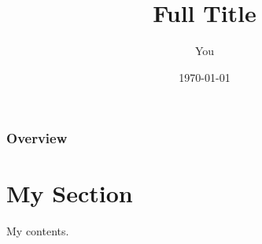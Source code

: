 \documentclass{beamer}
\title[Short Title]{Full Title}
\author{You}
\institute[Short Institution]{Full Institution \\ \medskip\textit{email}}
\date{\today}
\begin{document}
\begin{frame}
\titlepage
\end{frame}

\begin{frame}
\frametitle{Overview}
\tableofcontents
\end{frame}

\section{My Section}
\begin{frame}
My contents. \cite{dummy}
\end{frame}



\end{document}
